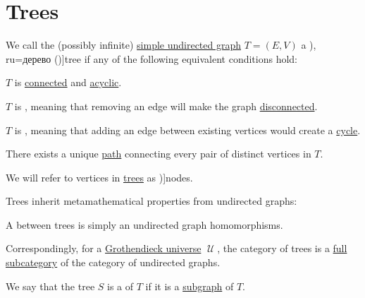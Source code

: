 \section{Trees}\label{sec:trees}

\begin{definition}\label{def:tree}
  We call the (possibly infinite) \hyperref[def:undirected_graph]{simple undirected graph} \( T = (E, V) \) a \term[bg=дърво (\cite[21]{Мирчев2001Графи}), ru=дерево (\cite[53]{ЕмеличевИПр1990ТеорияГрафов})]{tree} if any of the following equivalent conditions hold:
  \begin{thmenum}[series=def:tree]
     \( T \) is \hyperref[def:graph_connectedness/undirected]{connected} and \hyperref[def:acyclic_graph]{acyclic}.

     \( T \) is , meaning that removing an edge will make the graph \hyperref[def:graph_connectedness/undirected]{disconnected}.

     \( T \) is , meaning that adding an edge between existing vertices would create a \hyperref[def:graph_cycle]{cycle}.

     There exists a unique \hyperref[def:graph_walk/path]{path} connecting every pair of distinct vertices in \( T \).
  \end{thmenum}

  We will refer to vertices in \hyperref[def:tree]{trees} as \term[en=node (\cite[190]{Erickson2019Algorithms})]{nodes}.

  Trees inherit metamathematical properties from undirected graphs:
  \begin{thmenum}[resume=def:tree]
    \mimprovised A  between trees is simply an undirected graph homomorphisms.

    \mimprovised Correspondingly, for a \hyperref[def:grothendieck_universe]{Grothendieck universe} \( \mscrU \), the category of trees is a \hyperref[def:subcategory/full]{full subcategory} of the category of undirected graphs.

     We say that the tree \( S \) is a  of \( T \) if it is a \hyperref[def:undirected_graph/subgraph]{subgraph} of \( T \).
  \end{thmenum}
\end{definition}
